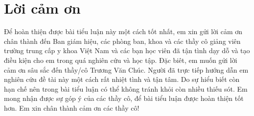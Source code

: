 \nopagebreak %
\section*{Lời cảm ơn}
Để hoàn thiện được bài tiểu luận này một cách tốt nhất,
em xin gửi lời cảm ơn chân thành đến Ban giám hiệu, các phòng ban, khoa
và các thầy cô giảng viên trường trung cấp y khoa Việt Nam và các bạn học viên
đã tận tình dạy dỗ và tạo điều kiện cho em trong quá nghiên cứu và học tập.
Đặc biêt, em muốn gửi lời cảm ơn sâu sắc đến thầy/cô Trương Văn Chúc.
Người đã trực tiếp hướng dẫn em nghiên cứu đề tài này một cách rất nhiệt tình và tận tâm.
Do sự hiểu biết còn hạn chế nên trong bài tiểu luận có thể không tránh khỏi 
còn nhiều thiếu sót. Em mong nhận được sự góp ý của các thầy cô, 
để bài tiểu luận được hoàn thiện tốt hơn. Em xin chân thành cảm ơn các thầy cô!
